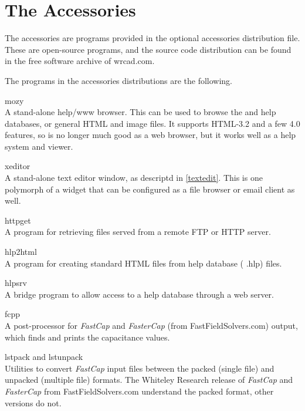 
\chapter{The {\XicTools} Accessories}

The {\XicTools} accessories are programs provided in the optional
accessories distribution file.  These are open-source programs, and
the source code distribution can be found in the free software archive
of {\vt wrcad.com}.

The programs in the accessories distributions are the following.

\begin{description}
\item{\vt mozy}\\
A stand-alone help/www browser.  This can be used to browse the {\Xic}
and {\WRspice} help databases, or general HTML and image files.  It
supports HTML-3.2 and a few 4.0 features, so is no longer much good as
a web browser, but it works well as a help system and viewer.

\item{\vt xeditor}\\
A stand-alone text editor window, as descriptd in \ref{textedit}. 
This is one polymorph of a widget that can be configured as a file
browser or email client as well.

\item{\vt httpget}\\
A program for retrieving files served from a remote FTP or HTTP
server.

\item{\vt hlp2html}\\
A program for creating standard HTML files from help database ({\vt
.hlp}) files.

\item{\vt hlpsrv}\\
A bridge program to allow access to a help database through a web
server.

\item{\vt fcpp}\\
A post-processor for {\it FastCap} and {\it FasterCap} (from {\vt
FastFieldSolvers.com}) output, which finds and prints the capacitance
values.

\item{\vt lstpack} and {\vt lstunpack}\\
Utilities to convert {\it FastCap} input files between the packed
(single file) and unpacked (multiple file) formats.  The Whiteley
Research release of {\it FastCap} and {\it FasterCap} from {\vt
FastFieldSolvers.com} understand the packed format, other versions do
not.
\end{description}


